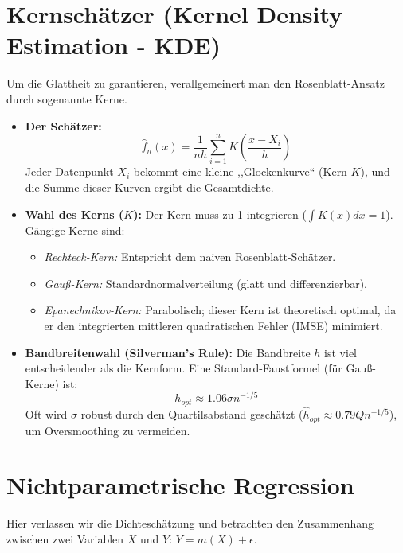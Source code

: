 \documentclass[a4paper, 11pt]{scrartcl}
\begin{document}
\section{Kernschätzer (Kernel Density Estimation - KDE)}
Um die Glattheit zu garantieren, verallgemeinert man den Rosenblatt-Ansatz durch sogenannte Kerne.
		
\begin{itemize}
	\item \textbf{Der Schätzer:}
	      \begin{equation}
	      	\hat{f}_n(x) = \frac{1}{nh} \sum_{i=1}^{n} K\left(\frac{x - X_i}{h}\right)
	      \end{equation}
	      Jeder Datenpunkt $X_i$ bekommt eine kleine ,,Glockenkurve`` (Kern $K$), und die Summe dieser Kurven ergibt die Gesamtdichte.
	      		    
	\item \textbf{Wahl des Kerns ($K$):} Der Kern muss zu 1 integrieren ($\int K(x)dx = 1$). Gängige Kerne sind:
	      \begin{itemize}
	      	\item \textit{Rechteck-Kern:} Entspricht dem naiven Rosenblatt-Schätzer.
	      	\item \textit{Gauß-Kern:} Standardnormalverteilung (glatt und differenzierbar).
	      	\item \textit{Epanechnikov-Kern:} Parabolisch; dieser Kern ist theoretisch optimal, da er den integrierten mittleren quadratischen Fehler (IMSE) minimiert.
	      \end{itemize}
	      		    
	\item \textbf{Bandbreitenwahl (Silverman's Rule):} Die Bandbreite $h$ ist viel entscheidender als die Kernform. Eine Standard-Faustformel (für Gauß-Kerne) ist:
	      \begin{equation}
	      	h_{opt} \approx 1.06 \sigma n^{-1/5}
	      \end{equation}
	      Oft wird $\sigma$ robust durch den Quartilsabstand geschätzt ($\hat{h}_{opt} \approx 0.79 Q n^{-1/5}$), um Oversmoothing zu vermeiden.
\end{itemize}
		
\section{Nichtparametrische Regression}
Hier verlassen wir die Dichteschätzung und betrachten den Zusammenhang zwischen zwei Variablen $X$ und $Y$: $Y = m(X) + \epsilon$.
	
\end{document}
